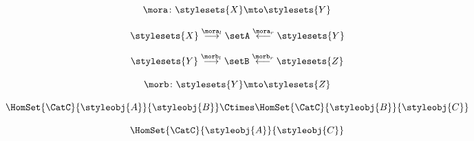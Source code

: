 \begin{forslides}
    \begin{equation}
        \label{eq:slides_multicategories_76}
        \mora \colon \stylesets{X}  \mto \stylesets{Y}
    \end{equation}

    \begin{equation}
        \label{eq:slides_multicategories_77}
        \stylesets{X} \overset{\mora_l}{\longrightarrow} \setA \overset{\mora_r}{\longleftarrow} \stylesets{Y}
    \end{equation}

    \begin{equation}
        \label{eq:slides_multicategories_78}
        \stylesets{Y} \overset{\morb_l}{\longrightarrow} \setB \overset{\morb_r}{\longleftarrow} \stylesets{Z}
    \end{equation}

    \begin{equation}
        \label{eq:slides_multicategories_79}
        \morb \colon \stylesets{Y}  \mto \stylesets{Z}
    \end{equation}

    \begin{equation}
        \label{eq:slides_multicategories_80}
        \HomSet{\CatC}{\styleobj{A}}{\styleobj{B}} \Ctimes \HomSet{\CatC}{\styleobj{B}}{\styleobj{C}}
    \end{equation}

    \begin{equation}
        \label{eq:slides_multicategories_81}
        \HomSet{\CatC}{\styleobj{A}}{\styleobj{C}}
    \end{equation}

\end{forslides}

\showslides{
    \begin{forslides}
        \begin{equation}
            \label{eq:composition_operad}
            [\mora,\morb]\mthen \morc
        \end{equation}
    \end{forslides}

}